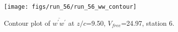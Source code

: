 \begin{figure}[H]
\centering
\texttt{[image: figs/run\_56/run\_56\_ww\_contour]}
\caption{Contour plot of $\overline{w^\prime w^\prime}$ at $z/c$=9.50, $V_{free}$=24.97, station 6.}
\label{fig:run_56_ww_contour}
\end{figure}


